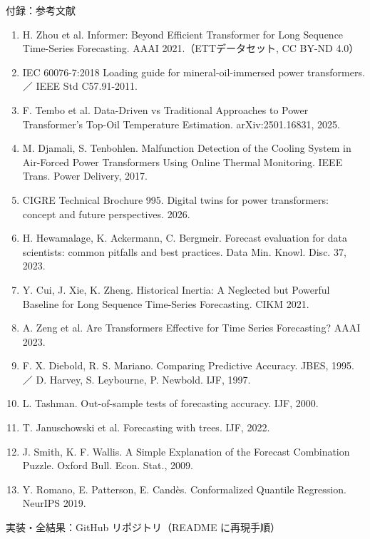 \documentclass[aspectratio=169,10pt]{beamer}
\begin{document}
\begin{frame}{付録：参考文献}
  \tiny
  \begin{enumerate}\setlength{\itemsep}{0pt}
    \item H. Zhou et al. Informer: Beyond Efficient Transformer for Long Sequence Time-Series Forecasting. AAAI 2021.（ETTデータセット, CC BY-ND 4.0）
    \item IEC 60076-7:2018 Loading guide for mineral-oil-immersed power transformers. ／ IEEE Std C57.91-2011.
    \item F. Tembo et al. Data-Driven vs Traditional Approaches to Power Transformer's Top-Oil Temperature Estimation. arXiv:2501.16831, 2025.
    \item M. Djamali, S. Tenbohlen. Malfunction Detection of the Cooling System in Air-Forced Power Transformers Using Online Thermal Monitoring. IEEE Trans. Power Delivery, 2017.
    \item CIGRE Technical Brochure 995. Digital twins for power transformers: concept and future perspectives. 2026.
    \item H. Hewamalage, K. Ackermann, C. Bergmeir. Forecast evaluation for data scientists: common pitfalls and best practices. Data Min. Knowl. Disc. 37, 2023.
    \item Y. Cui, J. Xie, K. Zheng. Historical Inertia: A Neglected but Powerful Baseline for Long Sequence Time-Series Forecasting. CIKM 2021.
    \item A. Zeng et al. Are Transformers Effective for Time Series Forecasting? AAAI 2023.
    \item F. X. Diebold, R. S. Mariano. Comparing Predictive Accuracy. JBES, 1995. ／ D. Harvey, S. Leybourne, P. Newbold. IJF, 1997.
    \item L. Tashman. Out-of-sample tests of forecasting accuracy. IJF, 2000.
    \item T. Januschowski et al. Forecasting with trees. IJF, 2022.
    \item J. Smith, K. F. Wallis. A Simple Explanation of the Forecast Combination Puzzle. Oxford Bull. Econ. Stat., 2009.
    \item Y. Romano, E. Patterson, E. Candès. Conformalized Quantile Regression. NeurIPS 2019.
  \end{enumerate}
  \vspace{0.2cm}
  {\scriptsize\color{muted}実装・全結果：GitHub リポジトリ（README に再現手順）}
\end{frame}
\end{document}
